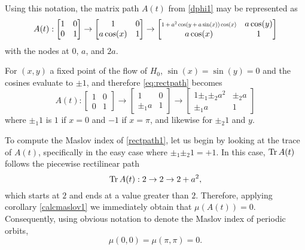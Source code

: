 Using this notation, the matrix path $A(t)$ from \eqref{dphi1} may be represented as
\begin{equation}\label{eq:rectpath}
A(t) :
\begin{bmatrix}
1 & 0\\
0 & 1
\end{bmatrix}
\to
\begin{bmatrix}
1 & 0\\
a \cos(x) & 1
\end{bmatrix}
\to
\begin{bmatrix}
\scalebox{0.7}{$1+ a^2 \cos(y+a \sin(x)) \cos(x)$} &  a \cos(y)\\
a \cos(x) & 1
\end{bmatrix}
\end{equation}
with the nodes at $0$, $a$, and $2a$.

For $(x,y)$ a fixed point of the flow of $H_0$, $\sin(x) = \sin(y) = 0$ and the cosines evaluate to $\pm 1$, and therefore \ref{eq:rectpath} becomes
\begin{equation}\label{rectpath1}
A(t):
\begin{bmatrix}
1 & 0\\
0 & 1
\end{bmatrix}
\to
\begin{bmatrix}
1 & 0\\
\pm_1 a & 1
\end{bmatrix}
\to
\begin{bmatrix}
1 \pm_1 \pm_2 a^2 &  \pm_2 a\\
\pm_1 a & 1
\end{bmatrix}
\end{equation}
where $\pm_1 1$ is $1$ if $x=0$ and $-1$ if $x = \pi$, and likewise for $\pm_2 1$ and $y$.

To compute the Maslov index of \eqref{rectpath1}, let us begin by looking at the trace of $A(t)$, specifically in the easy case where $\pm_1 \pm_2 1 = +1$. In this case, $\operatorname{Tr} A(t)$ follows the piecewise rectilinear path
\begin{equation}
\operatorname{Tr} A(t) : 2 \to 2 \to 2 + a^2,
\end{equation}
which starts at $2$ and ends at a value greater than $2$. Therefore, applying corollary \ref{calcmaslov1} we immediately obtain that $\mu(A(t)) = 0$. Consequently, using obvious notation to denote the Maslov index of periodic orbits,
\begin{equation}
\mu(0,0) = \mu(\pi,\pi) = 0.
\end{equation}


